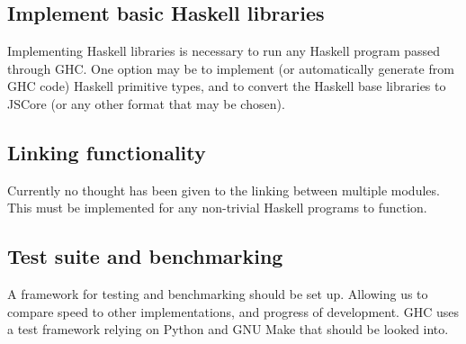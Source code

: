 \subsection{Implement basic Haskell libraries}

Implementing Haskell libraries is necessary to run any Haskell program passed 
through GHC. One option may be to implement (or automatically generate from GHC code) Haskell
primitive types, and to convert the Haskell base libraries to JSCore (or any other format that
may be chosen).

\subsection{Linking functionality}

Currently no thought has been given to the linking between multiple modules. This
must be implemented for any non-trivial Haskell programs to function.

\subsection{Test suite and benchmarking}

A framework for testing and benchmarking should be set up. Allowing us to compare
speed to other implementations, and progress of development. GHC uses a test framework
relying on Python and GNU Make that should be looked into.

